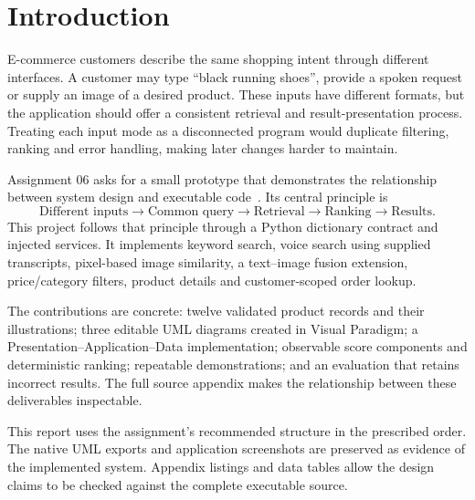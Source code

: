 \documentclass[11pt,a4paper]{article}
\begin{document}
\vspace{4mm}{\small The report follows the assignment's eleven-section structure. Complete implementation listings, dataset fixtures and evidence inventories are provided in the appendices.}
\clearpage
{\small\setlength{\parskip}{0pt}\tableofcontents}\clearpage
\listoffigures\clearpage

\section{Introduction}\label{sec:introduction}
E-commerce customers describe the same shopping intent through different interfaces. A customer may type ``black running shoes'', provide a spoken request or supply an image of a desired product. These inputs have different formats, but the application should offer a consistent retrieval and result-presentation process. Treating each input mode as a disconnected program would duplicate filtering, ranking and error handling, making later changes harder to maintain.

Assignment 06 asks for a small prototype that demonstrates the relationship between system design and executable code~\cite{assignment}. Its central principle is
\begin{equation}
\text{Different inputs}\rightarrow\text{Common query}\rightarrow\text{Retrieval}\rightarrow\text{Ranking}\rightarrow\text{Results}.
\end{equation}
This project follows that principle through a Python dictionary contract and injected services. It implements keyword search, voice search using supplied transcripts, pixel-based image similarity, a text--image fusion extension, price/category filters, product details and customer-scoped order lookup.

The contributions are concrete: twelve validated product records and their illustrations; three editable UML diagrams created in Visual Paradigm; a Presentation--Application--Data implementation; observable score components and deterministic ranking; repeatable demonstrations; and an evaluation that retains incorrect results. The full source appendix makes the relationship between these deliverables inspectable.

This report uses the assignment's recommended structure in the prescribed order. The native UML exports and application screenshots are preserved as evidence of the implemented system. Appendix listings and data tables allow the design claims to be checked against the complete executable source.
\end{document}
